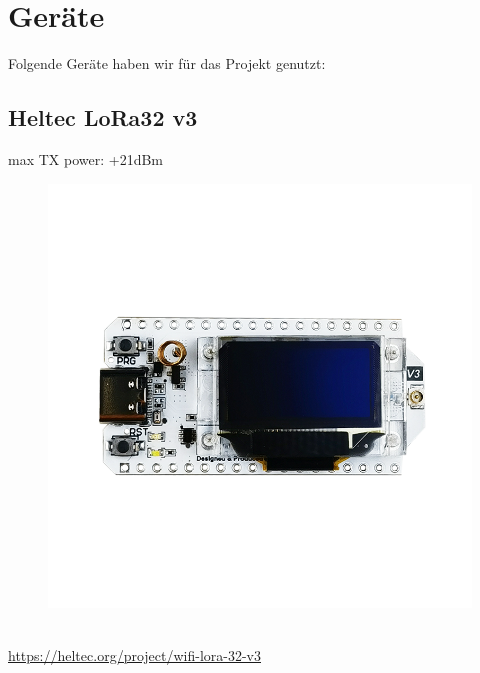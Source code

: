 \documentclass[12pt,a4paper]{article}
\begin{document}
\section{Geräte}

Folgende Geräte haben wir für das Projekt genutzt:

\subsection{Heltec LoRa32 v3}

max TX power: +21dBm\\
\begin{figure}[h]
	\includegraphics[scale=0.1]{./Bilder/Devices/heltec-lora32-v3.png}
\end{figure}\\
\url{https://heltec.org/project/wifi-lora-32-v3}\\
\end{document}

